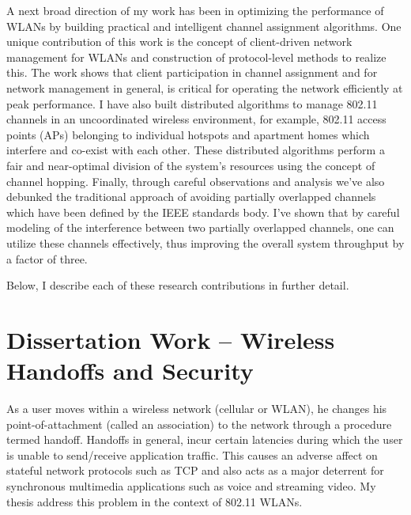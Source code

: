 \documentclass[11pt,letterpaper]{article}
\begin{document}
 A next broad direction of my work has been in optimizing the performance of WLANs by building practical and
intelligent channel assignment algorithms. One unique contribution of this work is the concept of client-driven network
management for WLANs and construction of protocol-level methods to realize this. The work shows that client participation in
channel assignment and for network management in general, is critical for operating the network efficiently at peak
performance. I have also built distributed algorithms to manage 802.11 channels in an uncoordinated wireless
environment, for example, 802.11 access points (APs) belonging to individual hotspots and apartment homes  which interfere and co-exist with
each other. These distributed algorithms perform a fair and near-optimal division of the system's resources using the concept of
channel hopping.  Finally, through careful observations and analysis we've also debunked the traditional approach of
avoiding partially overlapped channels which have been defined by the IEEE standards body.  I've shown that by careful modeling of the interference between two partially
overlapped channels, one can utilize these channels effectively, thus improving the overall system throughput by a
factor of three.

Below, I describe each of these research contributions in further detail.


\section{Dissertation Work -- Wireless Handoffs and Security}
As a user moves within a wireless
network (cellular or WLAN), he changes his point-of-attachment (called an association) to the network through a
procedure termed handoff. Handoffs in general, incur certain latencies during which the user is unable to send/receive
application traffic. This causes an adverse affect on stateful network protocols such as TCP and also acts as a major
deterrent for synchronous multimedia applications such as voice and streaming video. My thesis address this problem in
the context of 802.11 WLANs.  

\end{document}

